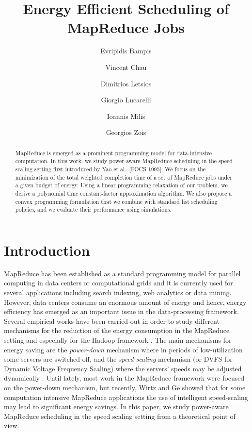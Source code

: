 \documentclass{llncs}
\begin{document}
\title{Energy Efficient Scheduling of MapReduce Jobs
}

\author{Evripidis Bampis
\and Vincent Chau
\and Dimitrios Letsios
\and Giorgio Lucarelli
\and Ioannis Milis
\and Georgios Zois
}


\maketitle

\begin{abstract}
MapReduce is emerged as a prominent programming model for data-intensive computation.
In this work, we study power-aware MapReduce scheduling in the speed scaling setting first introduced by Yao et al.~[FOCS 1995].
We focus on the minimization of the total weighted completion time of a set of MapReduce jobs under a given budget of energy.
Using a linear programming relaxation of our problem, we derive a polynomial time constant-factor approximation algorithm.
We also propose a convex programming formulation that we combine with standard list scheduling policies,
and we evaluate their performance using simulations.
\end{abstract}

\section{Introduction}

MapReduce has been established
as a standard programming model for parallel computing in data centers or computational grids and it is currently used
for several applications including search indexing, web analytics  or data mining.
However, data centers consume an enormous amount of energy and hence, energy efficiency has emerged as an important issue in the data-processing framework.
Several empirical works have been carried-out in order to study different mechanisms for the reduction of the energy consumption in the MapReduce setting
and especially for the Hadoop framework \cite{FellerRM13,FengLZY12,GoiriLNGTB12}.
The main  mechanisms for energy saving are the \emph{power-down} mechanism where in periods of low-utilization some servers are switched-off,
and the \emph{speed-scaling} mechanism (or DVFS for Dynamic Voltage Frequency Scaling) where the servers' speeds may be adjusted dynamically \cite{YaoDS95}.
Until lately, most work in the MapReduce framework  were focused on the  power-down mechanism, but recently,
Wirtz and Ge \cite{WirtzG11} showed that for some computation intensive MapReduce applications the use of intelligent speed-scaling
may lead to significant energy savings.
In this paper, we study power-aware MapReduce scheduling in the speed scaling setting from a theoretical point of view.
\end{document}
